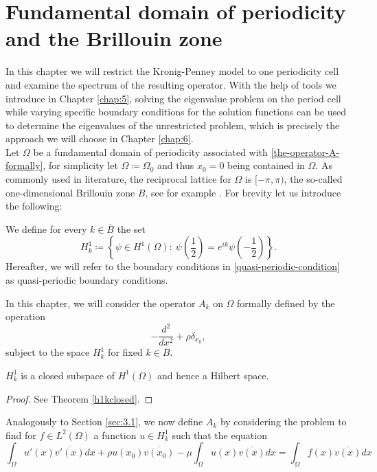 \chapter{Fundamental domain of periodicity and the Brillouin zone}  \label{chap:4}

In this chapter we will restrict the Kronig-Penney model to one periodicity cell and examine the spectrum of the resulting operator. With the help of tools we introduce in Chapter \ref{chap:5}, solving the eigenvalue problem on the period cell while varying specific boundary conditions for the solution functions can be used to determine the eigenvalues of the unrestricted problem, which is precisely the approach we will choose in Chapter \ref{chap:6}.
~\\ 

Let $\Omega$ be a fundamental domain of periodicity associated with \eqref{the-operator-A-formally}, for simplicity let $\Omega \coloneqq \Omega_{0}$ and thus $x_{0} = 0$ being contained in $\Omega$. As commonly used in literature, the reciprocal lattice for $\Omega$ is $[-\pi, \pi)$, the so-called one-dimensional Brillouin zone $B$, see for example \cite[Chapter 3]{dorfler2011photonic}. For brevity let us introduce the following:
\begin{definition} 
	We define for every $k \in \overline{B}$ the set  
	\begin{equation} 
		H^{1}_{k} \coloneqq \left\{ \psi \in H^{1}(\Omega): ~ \psi\left(\frac{1}{2}\right) = e^{ik} \psi\left(-\frac{1}{2}\right) \right\}. \label{quasi-periodic-condition}
	\end{equation}
	Hereafter, we will refer to the boundary conditions in \eqref{quasi-periodic-condition} as quasi-periodic boundary conditions.
\end{definition}
In this chapter, we will consider the operator $A_{k}$ on $\Omega$ formally defined by the operation 
	\[ -\frac{d^{2}}{dx^{2}} + \rho \delta_{x_{0}}, \]
subject to the space $H^{1}_{k}$ for fixed $k \in \overline{B}$.
	
\begin{remark}
	$H^{1}_{k}$ is a closed subspace of $H^{1}(\Omega)$ and hence a Hilbert space.
\end{remark}

\begin{proof}
	See Theorem \ref{h1kclosed}.
\end{proof}

Analogously to Section \ref{sec:3.1}, we now define $A_{k}$ by considering the problem to find for $f \in L^{2}(\Omega)$ a function $u \in H^{1}_{k}$ such that the equation
	\begin{equation}
		\int_{\Omega} u'(x) \overline{v'(x)} dx + \rho u(x_{0}) \overline{v(x_{0})} - \mu \int_{\Omega} u(x) \overline{v(x)} dx = \int_{\Omega} f(x) \overline{v(x)} dx \label{weak-formulation-to-the-restricted}
	\end{equation}

